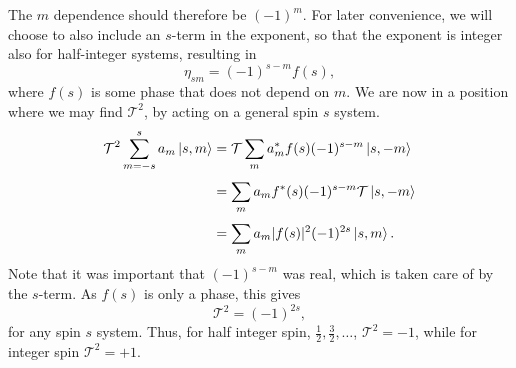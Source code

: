 The $m$ dependence should therefore be $(-1)^m$.
For later convenience, we will choose to also include an $s$-term in the exponent, so that the exponent is integer also for half-integer systems, resulting in
\begin{equation}
  \eta _{sm} = (-1)^{s-m} f(s),
\end{equation}
where  $f(s)$  is some phase that does not depend on $m$.
We are now in a position where we may find $\mathcal{T} ^2$, by acting on a general spin $s$ system.
\begin{align}
  \mathcal{T} ^2 \sum\limits_{m = -s}^s a_m \ket{s, m} &= \mathcal{T}  \sum\limits_m^{} a^{*}_m f(s) (-1)^{s-m} \ket{s, -m}\\
                                                  &= \sum\limits_m^{} a_m f^{*}(s) (-1)^{s-m} \mathcal{T} \ket{s, -m}\\
  &= \sum\limits_m^{} a_m |f(s)|^2 (-1)^{2s} \ket{s, m}.
\end{align}
Note that it was important that $(-1)^{s-m}$ was real, which is taken care of by the $s$-term.
As $f(s)$ is only a phase, this gives
\begin{equation}
  \mathcal{T} ^2 = (-1)^{2s},
\end{equation}
for any spin $s$ system.
Thus, for half integer spin, $\frac{1}{2}, \frac{3}{2}, \dots $, $\mathcal{T} ^2 = -1$, while for integer spin $\mathcal{T} ^2= +1$.


\begin{comment}
  We implement this by letting the time-reversal operator be a $\pi $ rotation of the spin, around some axis.
  Following the convention of considering this as a rotation around the $y$-axis, the $\mathcal{T} = UK$ operator gets the form~\cite{bernevigTopologicalInsulatorsTopological2013}
  $$
  \mathcal{T} = \eta e^{-i\pi S_y} K,
  $$
  where $\eta$ is some arbitrary phase and $S_y$ is the spin operator in the $y$-direction.
  Also, $\hbar = 1$ for ease of notation.
  Taylor expanding the exponential, splitting the terms into the $\sin$ and $\cos$ terms, and noting that
  \todo{TODO write something more legit here.}
  $$
  S_y^2 = \frac{1}{2}
  $$
  we can simplify the expression for $\mathcal{T}$.
  \begin{equation}
    \mathcal{T} = - i \eta \left(2 S_y\right) K.
  \end{equation}
  Thus, one gets
  \begin{equation}
    \mathcal{T}^2 =
    4 i \eta^2 S_y K i  S_y K =
    4 i \eta^2 S_y (-i S_y^*) =
    4 i \eta^2 S_y S_y^* =
    -4 i \eta^2 S_y^2.
  \end{equation}
\end{comment}
